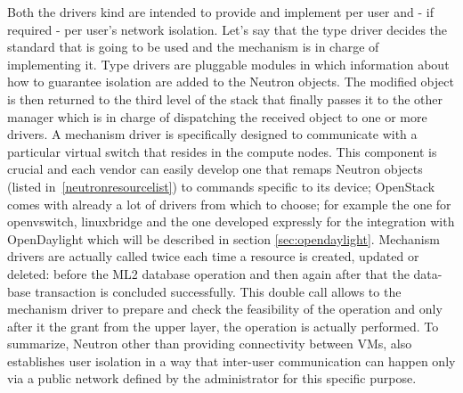 Both the drivers kind are intended to provide and implement per user and - if required - per user's network isolation. Let's say that the type driver decides the standard that is going to be used and the mechanism is in charge of implementing it.
Type drivers are pluggable modules in which information about how to guarantee isolation are added to the Neutron objects. The modified object is then returned to the third level of the stack that finally passes it to the other manager which is in charge of dispatching the received object to one or more drivers.
A mechanism driver is specifically designed to communicate with a particular virtual switch that resides in the compute nodes. This component is crucial and each vendor can easily develop one that remaps Neutron objects (listed in~\ref{neutronresourcelist}) to commands specific to its device; OpenStack comes with already a lot of drivers from which to choose; for example the one for openvswitch, linuxbridge and the one developed expressly for the integration with OpenDaylight which will be described in section \ref{sec:opendaylight}.
Mechanism drivers are actually called twice each time a resource is created, updated or deleted: before the ML2 database operation and then again after that the data-base transaction is concluded successfully.
This double call allows to the mechanism driver to prepare and check the feasibility of the operation and only after it the grant from the upper layer, the operation is actually performed.
To summarize, Neutron other than providing connectivity between VMs, also establishes user isolation in a way that inter-user communication can happen only via a public network defined by the administrator for this specific purpose.

